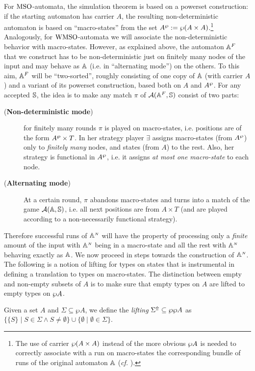 For $\mathrm{MSO}$-automata, the simulation theorem is based on a powerset construction: if the starting automaton has carrier $A$, the resulting non-deterministic automaton is based on ``macro-states'' from the set $A^{\wp} := \wp (A \times A)$.\footnote{The use of carrier $\wp (A \times A)$ instead of the more obvious $\wp A$ is needed to correctly associate with a run on macro-states the corresponding bundle of runs of the original automaton $\mathbb{A}$ (\emph{cf.} \cite{Walukiewicz96}).} Analogously, for $\mathrm{WMSO}$-automata we will associate the non-deterministic behavior with macro-states. However, as explained above, the automaton $\mathbb{A}^{F}$ that we construct has to be non-deterministic just on finitely many nodes of the input and may behave as $\mathbb{A}$ (i.e. in ``alternating mode'') on the others. To this aim, $\mathbb{A}^{F}$ will be ``two-sorted'', roughly consisting of one copy of $\mathbb{A}$ (with carrier $A$) and a variant of its powerset construction, based both on $A$ and $A^{\wp}$. For any accepted $\mathbb{S}$, the idea is to make any match $\pi$ of $\mathcal{A}(\mathbb{A}^{F},\mathbb{S})$ consist of two parts:
\begin{description}
  \item[(\textbf{Non-deterministic mode})] for finitely many rounds $\pi$ is played on macro-states, i.e. positions are of the form $A^{\wp} \times T$. In her strategy player $\exists$ assigns macro-states (from $A^{\wp}$) only to \emph{finitely many} nodes, and states (from $A$) to the rest. Also, her strategy is functional in $A^{\wp}$, i.e. it assigns \emph{at most one macro-state} to each node.
  \item[(\textbf{Alternating mode})] At a certain round, $\pi$ abandons macro-states and turns into a match of the game $\mathcal{A}(\mathbb{A},\mathbb{S})$, i.e. all next positions are from $A \times T$ (and are played according to a non-necessarily functional strategy). %
\end{description}
Therefore successful runs of $\mathbb{A}^{{\scriptscriptstyle N}}$ will have the property of processing only a \emph{finite} amount of the input with $\mathbb{A}^{{\scriptscriptstyle N}}$ being in a macro-state and all the rest with $\mathbb{A}^{{\scriptscriptstyle N}}$ behaving exactly as $\mathbb{A}$. We now proceed in steps towards the construction of $\mathbb{A}^{{\scriptscriptstyle N}}$. The following is a notion of lifting for types on states that is instrumental in defining a translation to types on macro-states. The distinction between empty and non-empty subsets of $A$ is to make sure that empty types on $A$ are lifted to empty types on $\wp A$.
\begin{definition}
Given a set $A$ and $\Sigma \subseteq \wp A$, we define the \emph{lifting} $\Sigma^{\Uparrow} \subseteq \wp \wp A$ as $\{\{S\} \mid S \in \Sigma \wedge S \neq \emptyset\} \cup
    \{\emptyset \mid \emptyset \in \Sigma \}$.
\end{definition}

